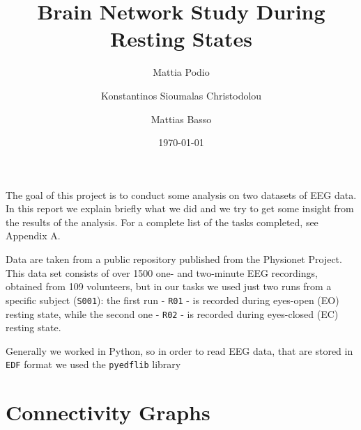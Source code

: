 \documentclass[%
 aip,
 jmp,%
 amsmath,amssymb,
 reprint,%
]{revtex4-1}
\begin{document}
\title[Brain Network Study During Resting States]{Brain Network Study During Resting States\\}

\author{Mattia Podio}

\author{Konstantinos Sioumalas Christodolou}%

\author{Mattias Basso}

\date{\today}%

\maketitle



The goal of this project is to conduct some analysis on two datasets of EEG data. In this report we explain briefly what we did and we try to get some insight from the results of the analysis. For a complete list of the tasks completed, see Appendix A.

Data \cite{dataset} are taken from a public repository published from the Physionet Project. This data set consists of over 1500 one- and two-minute EEG recordings, obtained from 109 volunteers, but in our tasks we used just two runs from a specific subject (\verb|S001|): the first run - \verb|R01| - is recorded during eyes-open (EO) resting state, while the second one - \verb|R02| - is recorded during eyes-closed (EC) resting state.

Generally we worked in Python, so in order to read EEG data, that are stored in \verb|EDF| format we used the \verb|pyedflib| library \cite{pyedflib}

\section{\label{sec:level1}Connectivity Graphs}
\end{document}
